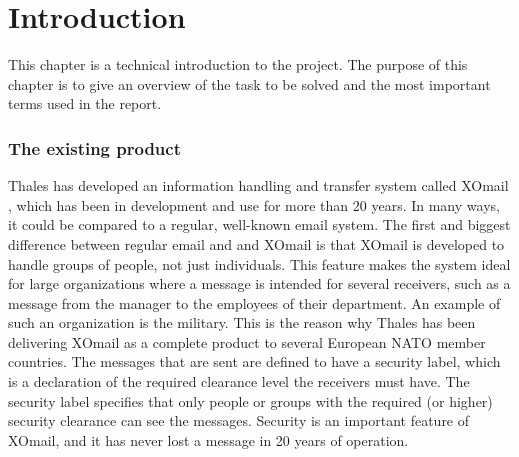 \chapter{Introduction}

This chapter is a technical introduction to the project. The purpose of this chapter is to give an overview of the task to be solved and the most important terms used in the report.

\subsection*{The existing product}
Thales has developed an information handling and transfer system called XOmail \cite{bib:xomail}, which has been in development and use for more than 20 years. In many ways, it could be compared to a regular, well-known email system. The first and biggest difference between regular email and and XOmail is that XOmail is developed to handle groups of people, not just individuals. This feature makes the system ideal for large organizations where a message is intended for several receivers, such as a message from the manager to the employees of their department. An example of such an organization is the military. This is the reason why Thales has been delivering XOmail as a complete product to several European NATO member countries.  
\newline
\newline
The messages that are sent are defined to have a security label, which is a declaration of the required clearance level the receivers must have. The security label specifies that only people or groups with the required (or higher) security clearance can see the messages. Security is an important feature of XOmail, and it has never lost a message in 20 years of operation. 

